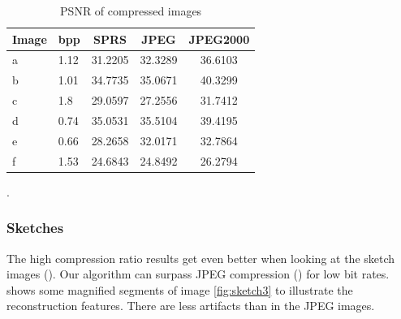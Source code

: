 \begin{table}[h]
\centering

\begin{tabular}{| l l | c | c | c|}
\hline\hline
Image & bpp & SPRS & JPEG & JPEG2000 \\
\hline
a & 1.12 & 31.2205 & 32.3289 & 36.6103 \\
\hline
b & 1.01 & 34.7735 & 35.0671 & 40.3299 \\
\hline
c & 1.8  & 29.0597 & 27.2556 & 31.7412 \\
\hline
d & 0.74 & 35.0531 & 35.5104 & 39.4195 \\
\hline
e & 0.66 & 28.2658 & 32.0171 & 32.7864 \\
\hline
f & 1.53 & 24.6843  & 24.8492 & 26.2794 \\
\hline
\end{tabular}
\caption{PSNR of compressed images}
\label{tab:compression1}.
\end{table} 


\subsubsection{Sketches}
The high compression ratio results get even better when looking at the sketch
images (). Our algorithm can surpass JPEG
compression () for low bit rates.
 shows some magnified segments of image
\ref{fig:sketch3} to illustrate the reconstruction features. There are less
artifacts than in the JPEG images. 

